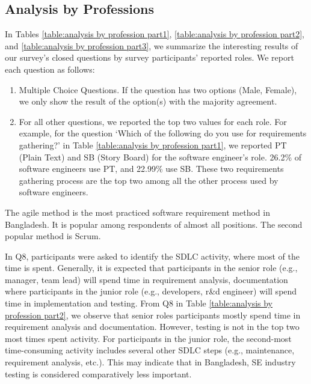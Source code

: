\subsection{Analysis by Professions}
\label{analyze_by_professions}
In Tables \ref{table:analysis by profession part1}, \ref{table:analysis by profession part2}, and \ref{table:analysis by profession part3}, we summarize the interesting results of our survey's closed questions by survey participants' reported roles. We report each question as follows:

\begin{enumerate}[label=\arabic*)]
    \item Multiple Choice Questions. If the question has two options (Male, Female), we only show the result of the option(s) with the majority agreement.
    \item For all other questions, we reported the top two values for each role. For example, for the question ‘Which of the following do you use for requirements gathering?’ in Table \ref{table:analysis by profession part1}, we reported PT (Plain Text) and SB (Story Board) for the software engineer's role. 26.2\% of software engineers use PT, and 22.99\% use SB. These two requirements gathering process are the top two among all the other process used by software engineers.
\end{enumerate}





The agile method is the most practiced software requirement method in Bangladesh. It is popular among respondents of almost all positions. The second popular method is Scrum.

In Q8, participants were asked to identify the SDLC activity, where most of the time is spent. Generally, it is expected that participants in the senior role (e.g., manager, team lead) will spend time in requirement analysis, documentation where participants in the junior role (e.g., developers, r\&d engineer) will spend time in implementation and testing. From  Q8 in Table \ref{table:analysis by profession part2}, we observe that senior roles participants mostly spend time in requirement analysis and documentation. However, testing is not in the top two most times spent activity. For participants in the junior role, the second-most time-consuming activity includes several other SDLC steps (e.g., maintenance, requirement analysis, etc.). This may indicate that in Bangladesh, SE industry testing is considered comparatively less important.


